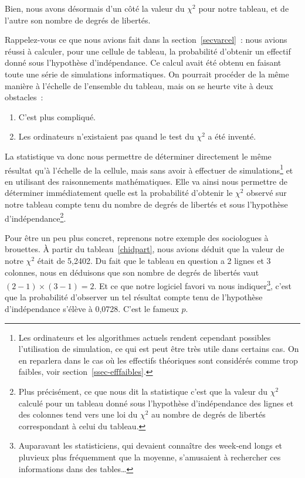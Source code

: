 \documentclass[a4paper,10pt,twoside,francais]{report}
\newcommand{\chid}{$\chi^2$\xspace}
\begin{document}
Bien, nous avons désormais d'un côté la valeur du \chid pour notre
tableau, et de l'autre son nombre de degrés de libertés. 

Rappelez-vous ce que nous avions fait dans la
section~\vref{secvarcel}~: nous avions réussi à calculer, pour une
cellule de tableau, la probabilité d'obtenir un effectif donné sous
l'hypothèse d'indépendance. Ce calcul avait été obtenu en faisant
toute une série de simulations informatiques. On pourrait procéder de
la même manière à l'échelle de l'ensemble du tableau, mais on se
heurte vite à deux obstacles~:
\begin{enumerate}
\item C'est plus compliqué.
\item Les ordinateurs n'existaient pas quand le test du \chid a été inventé.
\end{enumerate}

La statistique va donc nous permettre de déterminer directement le
même résultat qu'à l'échelle de la cellule, mais sans avoir à
effectuer de simulations\footnote{Les ordinateurs et les algorithmes
  actuels rendent cependant possibles l'utilisation de simulation, ce
  qui est peut être très utile dans certains cas. On en reparlera dans
  le cas où les effectifs théoriques sont considérés comme trop
  faibles, voir section~\vref{ssec-efffaibles}.} et en utilisant des
raisonnements mathématiques. Elle va ainsi nous permettre de
déterminer immédiatement quelle est la probabilité d'obtenir le \chid
observé sur notre tableau compte tenu du nombre de degrés de libertés
et sous l'hypothèse d'indépendance\footnote{Plus précisément, ce que
  nous dit la statistique c'est que la valeur du \chid calculé pour un
  tableau donné sous l'hypothèse d'indépendance des lignes et des
  colonnes tend vers une loi du \chid au nombre de degrés de libertés
  correspondant à celui du tableau.}.

Pour être un peu plus concret, reprenons notre exemple des sociologues
à brouettes. À partir du tableau~\vref{chidpart}, nous avions déduit
que la valeur de notre \chid était de 5,2402. Du fait que le tableau
en question a 2 lignes et 3 colonnes, nous en déduisons que son nombre
de degrés de libertés vaut $(2-1) \times (3-1) = 2$. Et ce que notre
logiciel favori va nous indiquer\footnote{Auparavant les
  statisticiens, qui devaient connaître des week-end longs et pluvieux
  plus fréquemment que la moyenne, s'amusaient à rechercher ces
  informations dans des tables\ldots}, c'est que la probabilité
d'observer un tel résultat compte tenu de l'hypothèse d'indépendance
s'élève à 0,0728. C'est le fameux $p$.
\end{document}
